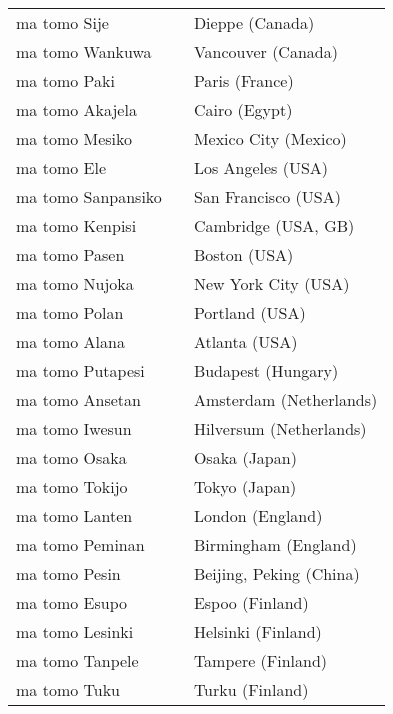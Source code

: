 \begin{supertabular}{p{4,5cm}|ll}
    ma tomo Sije                      &  & Dieppe (Canada)           \\
    ma tomo Wankuwa                   &  & Vancouver (Canada)        \\
    ma tomo Paki                      &  & Paris (France)            \\
    ma tomo Akajela                   &  & Cairo (Egypt)             \\
    ma tomo Mesiko                    &  & Mexico City (Mexico)      \\
    ma tomo Ele                       &  & Los Angeles (USA)         \\
    ma tomo Sanpansiko                &  & San Francisco (USA)       \\
    ma tomo Kenpisi                   &  & Cambridge (USA, GB)       \\
    ma tomo Pasen                     &  & Boston (USA)              \\
    ma tomo Nujoka                    &  & New York City (USA)       \\
    ma tomo Polan                     &  & Portland (USA)            \\
    ma tomo Alana                     &  & Atlanta (USA)             \\
    ma tomo Putapesi                  &  & Budapest (Hungary)        \\
    ma tomo Ansetan                   &  & Amsterdam (Netherlands)   \\
    ma tomo Iwesun                    &  & Hilversum (Netherlands)   \\
    ma tomo Osaka                     &  & Osaka (Japan)             \\
    ma tomo Tokijo                    &  & Tokyo (Japan)             \\
    ma tomo Lanten                    &  & London (England)          \\
    ma tomo Peminan                   &  & Birmingham (England)      \\
    ma tomo Pesin                     &  & Beijing, Peking (China)   \\
    ma tomo Esupo                     &  & Espoo (Finland)           \\
    ma tomo Lesinki                   &  & Helsinki (Finland)        \\
    ma tomo Tanpele                   &  & Tampere (Finland)         \\
    ma tomo Tuku                      &  & Turku (Finland)           \\

\end{supertabular}
